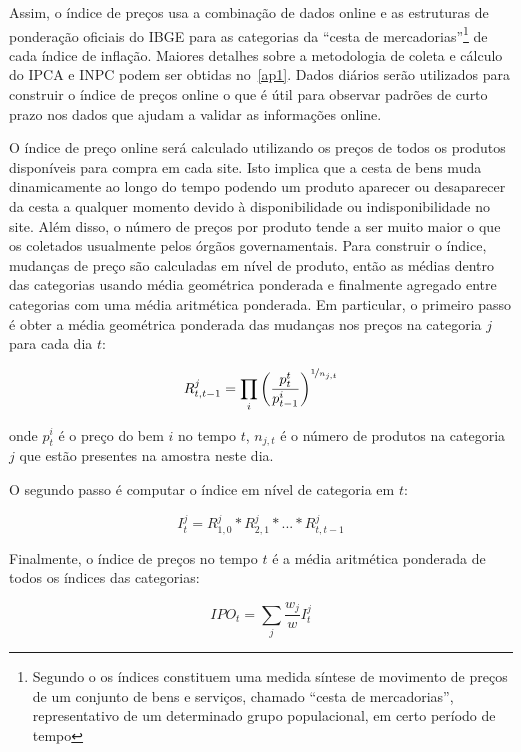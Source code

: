 \documentclass[twoside,a4paper,11pt]{report}
\begin{document}
Assim, o índice de preços usa a combinação de dados online e as estruturas de ponderação oficiais do IBGE para as categorias da “cesta de mercadorias”\footnote[1]{Segundo o \citet{ibgemetodos} os índices constituem uma medida síntese de movimento de preços de um conjunto de bens e serviços, chamado “cesta de mercadorias”, representativo de um determinado grupo populacional, em certo período de tempo} de cada índice de inflação. Maiores detalhes sobre a metodologia de coleta e cálculo do IPCA e INPC podem ser obtidas no~\ref{ap1}. Dados diários serão utilizados para construir o índice de preços online o que é útil para observar padrões de curto prazo nos dados que ajudam a validar as informações online. 
  
O índice de preço online será calculado utilizando os preços de todos os produtos disponíveis para compra em cada site. Isto implica que a cesta de bens muda dinamicamente ao longo do tempo podendo um produto aparecer ou desaparecer da cesta a qualquer momento devido à disponibilidade ou indisponibilidade no site. Além disso, o número de preços por produto tende a ser muito maior o que os coletados usualmente pelos órgãos governamentais. 
Para construir o índice, mudanças de preço são calculadas em nível de produto, então as médias dentro das categorias usando média geométrica ponderada e finalmente agregado entre categorias com uma média aritmética ponderada. Em particular, o primeiro passo é obter a média geométrica ponderada das mudanças nos preços na categoria $j$ para cada dia $t$:

\begin{equation}\label{eq01en01}
R_{t,t-1}^{j}=\prod_{i}\left(\frac{p_{t}^{t}}{p_{t-1}^{i}}\right)^{\nicefrac{1}{n_{j,t}}}
\end{equation}

\noindent onde $p_{t}^{i}$ é o preço do bem $i$ no tempo $t$, $n_{j,t}$ é o número de produtos na categoria $j$ que estão presentes na amostra neste dia. 

O segundo passo é computar o índice em nível de categoria em $t$:

\begin{equation}\label{eq02en01}
I_{t}^{j}=R_{1,0}^{j}\ast{R}_{2,1}^{j}\ast{...}\ast{R}_{t,t-1}^{j}
\end{equation}

Finalmente, o índice de preços no tempo $t$ é a média aritmética ponderada de todos os índices das categorias:

\begin{equation}\label{eq03en01}
IPO_{t}=\sum_{j}{\frac{w_{j}}{w}I_{t}^{j}} 
\end{equation}
\end{document}
